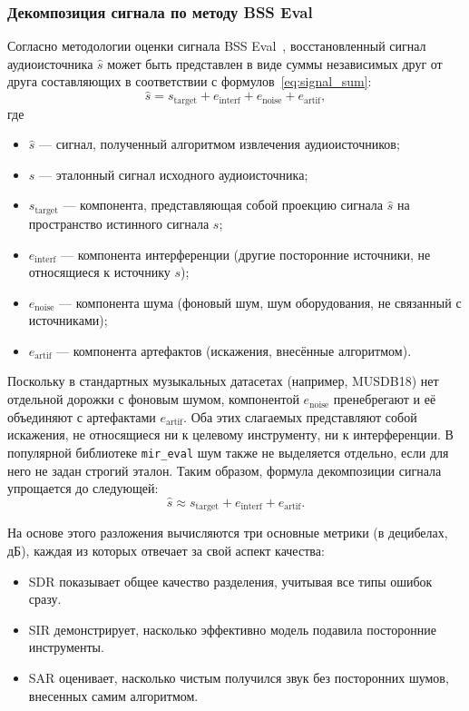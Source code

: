 \documentclass[14pt]{extarticle}
\begin{document}
\subsubsection{Декомпозиция сигнала по методу BSS Eval}
Согласно методологии оценки сигнала BSS Eval~\cite{metrics}, восстановленный сигнал аудиоисточника $\hat{s}$ может быть представлен в виде суммы
независимых друг от друга составляющих в соответствии с формулов~\ref{eq:signal_sum}:
\begin{equation}
	\label{eq:signal_sum}
    \hat{s} = s_{\mathrm{target}} + e_{\mathrm{interf}} + e_{\mathrm{noise}} + e_{\mathrm{artif}},
\end{equation}
где
\begin{itemize}[label=$\bullet$, wide]
	\item $\hat{s}$ --- сигнал, полученный алгоритмом извлечения аудиоисточников;
	\item $s$ --- эталонный сигнал исходного аудиоисточника;
	\item $s_{\mathrm{target}}$ --- компонента, представляющая собой проекцию сигнала $\hat{s}$ на пространство истинного сигнала $s$;
	\item $e_{\mathrm{interf}}$ --- компонента интерференции (другие посторонние источники, не относящиеся к источнику $s$);
	\item $e_{\mathrm{noise}}$ --- компонента шума (фоновый шум, шум оборудования, не связанный с источниками);
	\item $e_{\mathrm{artif}}$ --- компонента артефактов (искажения, внесённые алгоритмом).
\end{itemize}

Поскольку в стандартных музыкальных датасетах (например, MUSDB18) нет отдельной дорожки с фоновым шумом, компонентой $e_{\mathrm{noise}}$ 
пренебрегают и её объединяют с артефактами $e_{\mathrm{artif}}$. 
Оба этих слагаемых представляют собой искажения, не относящиеся ни к целевому инструменту, ни к интерференции. 
В популярной библиотеке \texttt{mir\_eval} шум также не выделяется отдельно, если для него не задан строгий эталон. 
Таким образом, формула декомпозиции сигнала упрощается до следующей:
\begin{equation*}
    \hat{s} \approx s_{\mathrm{target}} + e_{\mathrm{interf}} + e_{\mathrm{artif}}.
\end{equation*}

На основе этого разложения вычисляются три основные метрики (в децибелах, дБ), каждая из которых отвечает за свой аспект качества:
\begin{itemize}[label=$\bullet$, wide]
    \item SDR показывает общее качество разделения, учитывая все типы ошибок сразу.
    \item SIR демонстрирует, насколько эффективно модель подавила посторонние инструменты.
    \item SAR оценивает, насколько чистым получился звук без посторонних шумов, внесенных самим алгоритмом.
\end{itemize}
\end{document}
